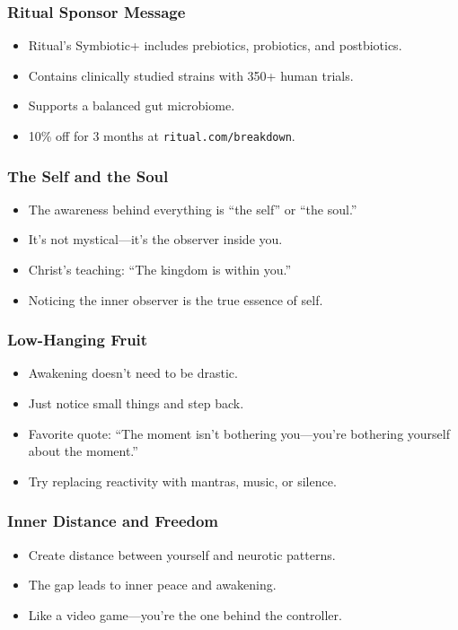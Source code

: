 \begin{frame}[fragile]\frametitle{Ritual Sponsor Message}
  \begin{itemize}
    \item Ritual’s Symbiotic+ includes prebiotics, probiotics, and postbiotics.
    \item Contains clinically studied strains with 350+ human trials.
    \item Supports a balanced gut microbiome.
    \item 10\% off for 3 months at \texttt{ritual.com/breakdown}.
  \end{itemize}
\end{frame}

\begin{frame}[fragile]\frametitle{The Self and the Soul}
  \begin{itemize}
    \item The awareness behind everything is “the self” or “the soul.”
    \item It’s not mystical—it’s the observer inside you.
    \item Christ’s teaching: “The kingdom is within you.”
    \item Noticing the inner observer is the true essence of self.
  \end{itemize}
\end{frame}

\begin{frame}[fragile]\frametitle{Low-Hanging Fruit}
  \begin{itemize}
    \item Awakening doesn’t need to be drastic.
    \item Just notice small things and step back.
    \item Favorite quote: “The moment isn’t bothering you—you’re bothering yourself about the moment.”
    \item Try replacing reactivity with mantras, music, or silence.
  \end{itemize}
\end{frame}

\begin{frame}[fragile]\frametitle{Inner Distance and Freedom}
  \begin{itemize}
    \item Create distance between yourself and neurotic patterns.
    \item The gap leads to inner peace and awakening.
    \item Like a video game—you’re the one behind the controller.
  \end{itemize}
\end{frame}

